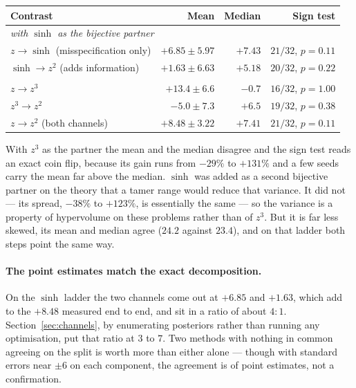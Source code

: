 \begin{center}
\begin{tabular}{lrrr}
\toprule
Contrast & Mean & Median & Sign test \\
\midrule
\multicolumn{4}{l}{\emph{with $\sinh$ as the bijective partner}}\\
$z \to \sinh$ \quad (misspecification only) & $+6.85\pm5.97$ & $+7.43$ & $21/32$, $p=0.11$ \\
$\sinh \to z^2$ \quad (adds information) & $+1.63\pm6.63$ & $+5.18$ & $20/32$, $p=0.22$ \\
\addlinespace
\multicolumn{4}{l}{\emph{with $z^3$ as the bijective partner}}\\
$z \to z^3$ & $+13.4\pm6.6$ & $-0.7$ & $16/32$, $p=1.00$ \\
$z^3 \to z^2$ & $-5.0\pm7.3$ & $+6.5$ & $19/32$, $p=0.38$ \\
\addlinespace
$z \to z^2$ \quad (both channels) & $+8.48\pm3.22$ & $+7.41$ & $21/32$, $p=0.11$ \\
\bottomrule
\end{tabular}
\end{center}

\noindent With $z^3$ as the partner the mean and the median disagree and the
sign test reads an exact coin flip, because its gain runs from $-29\%$ to
$+131\%$ and a few seeds carry the mean far above the median. $\sinh$ was added
as a second bijective partner on the theory that a tamer range would reduce
that variance. It did not --- its spread, $-38\%$ to $+123\%$, is essentially
the same --- so the variance is a property of hypervolume on these problems
rather than of $z^3$. But it is far less skewed, its mean and median agree
($24.2$ against $23.4$), and on that ladder both steps point the same way.

\paragraph{The point estimates match the exact decomposition.} On the $\sinh$
ladder the two channels come out at $+6.85$ and $+1.63$, which add to the
$+8.48$ measured end to end, and sit in a ratio of about $4{:}1$.
Section~\ref{sec:channels}, by enumerating posteriors rather than running any
optimisation, put that ratio at $3$ to $7$. Two methods with nothing in
common agreeing on the split is worth more than either alone --- though with
standard errors near $\pm6$ on each component, the agreement is of point
estimates, not a confirmation.

